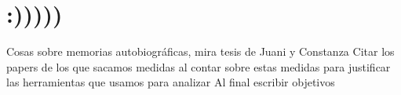 
\section{:)))))}

Cosas sobre memorias autobiográficas, mira tesis de Juani y Constanza
Citar los papers de los que sacamos medidas al contar sobre estas medidas para justificar las herramientas que usamos para analizar
Al final escribir objetivos



